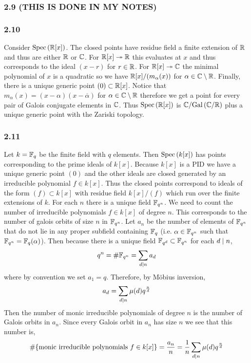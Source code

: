 \documentclass[12pt]{article}
\begin{document}
\subsubsection{2.9 (THIS IS DONE IN MY NOTES)}


\subsubsection{2.10}

Consider $\mathrm{Spec}\left( \mathbb{R}[x] \right)$. The closed points have residue field a finite extension of $\mathbb{R}$ and thus are either $\mathbb{R}$ or $\mathbb{C}$. For $\mathbb{R}[x] \twoheadrightarrow \mathbb{R}$ this evaluates at $x$ and thus corresponds to the ideal $(x - r)$ for $r \in \mathbb{R}$. For $\mathbb{R}[x] \twoheadrightarrow \mathbb{C}$ the minimal polynomial of $x$ is a quadratic so we have $\mathbb{R}[x]/(m_\alpha(x))$ for $\alpha \in \mathbb{C} \setminus \mathbb{R}$. Finally, there is a unique generic point $(0) \subset \mathbb{R}[x]$. Notice that $m_\alpha(x) = (x - \alpha)(x - \overline{\alpha})$ for $\alpha \in \mathbb{C} \setminus \mathbb{R}$ therefore we get a point for every pair of Galois conjugate elements in $\mathbb{C}$. Thus $\mathrm{Spec}\left( \mathbb{R}[x] \right)$ is $\mathbb{C} / \mathrm{Gal}\left( \mathbb{C}/\mathbb{R} \right)$ plus a unique generic point with the Zariski topology.

\subsubsection{2.11}

Let $k = \mathbb{F}_q$ be the finite field with $q$ elements. Then $\mathrm{Spec}\left( k[x] \right)$ has points corresponding to the prime ideals of $k[x]$. Because $k[x]$ is a PID we have a unique generic point $(0)$ and the other ideals are closed generated by an irreducible polynomial $f \in k[x]$. Thus the closed points correspond to ideals of the form $(f) \subset k[x]$ with residue field $k[x]/(f)$ which run over the finite extensions of $k$. For each $n$ there is a unique field $\mathbb{F}_{q^n}$. We need to count the number of irreducible polynomials $f \in k[x]$ of degree $n$. This corresponds to the number of galois orbits of size $n$ in $\mathbb{F}_{q^n}$. Let $a_n$ be the number of elements of $\mathbb{F}_{q^n}$ that do not lie in any proper subfield containing $\mathbb{F}_q$ (i.e. $\alpha \in \mathbb{F}_{q^n}$ such that $\mathbb{F}_{q^n} = \mathbb{F}_q(\alpha)$). Then because there is a unique field $\mathbb{F}_{q^d} \subset \mathbb{F}_{q^n}$ for each $d \mid n$,
\[ q^n = \# \mathbb{F}_{q^n} = \sum_{d \mid n} a_d \]
where by convention we set $a_1 = q$. Therefore, by M\"{o}bius inversion,
\[ a_d = \sum_{d \mid n} \mu(d) q^{\frac{n}{d}} \]
Then the number of monic irreducible polynomials of degree $n$ is the number of Galois orbits in $a_n$. Since every Galois orbit in $a_n$ has size $n$ we see that this number is,
\[ \# \{ \text{monic irreducible polynomials } f \in k[x] \} = \frac{a_n}{n} = \frac{1}{n} \sum_{d \mid n} \mu(d) q^{\frac{n}{d}} \]
\end{document}
